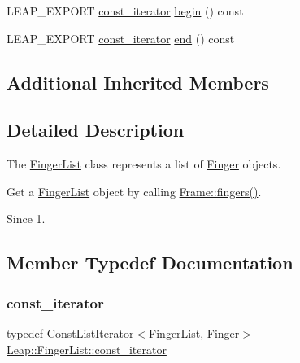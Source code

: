 \begin{DoxyCompactItemize}
\item 
L\+E\+A\+P\+\_\+\+E\+X\+P\+O\+RT \hyperlink{class_leap_1_1_finger_list_a9ecff6e555096064a09bb66a8cb5e567}{const\+\_\+iterator} \hyperlink{class_leap_1_1_finger_list_aaa68dfcacf93dd09271a746fb90c7523}{begin} () const
\item 
L\+E\+A\+P\+\_\+\+E\+X\+P\+O\+RT \hyperlink{class_leap_1_1_finger_list_a9ecff6e555096064a09bb66a8cb5e567}{const\+\_\+iterator} \hyperlink{class_leap_1_1_finger_list_a75479dbb992e84540e66179c90bd67bd}{end} () const
\end{DoxyCompactItemize}
\subsection*{Additional Inherited Members}


\subsection{Detailed Description}
The \hyperlink{class_leap_1_1_finger_list}{Finger\+List} class represents a list of \hyperlink{class_leap_1_1_finger}{Finger} objects.

Get a \hyperlink{class_leap_1_1_finger_list}{Finger\+List} object by calling \hyperlink{class_leap_1_1_frame_ad26c14d07eae913a7ff17e0ce1f2be12}{Frame\+::fingers()}.


\begin{DoxyCodeInclude}
\end{DoxyCodeInclude}


\begin{DoxySince}{Since}
1. 
\end{DoxySince}


\subsection{Member Typedef Documentation}
\mbox{\label{class_leap_1_1_finger_list_a9ecff6e555096064a09bb66a8cb5e567}} 
\subsubsection{\texorpdfstring{const\+\_\+iterator}{const\_iterator}}
{\footnotesize\ttfamily typedef \hyperlink{class_leap_1_1_const_list_iterator}{Const\+List\+Iterator}$<$\hyperlink{class_leap_1_1_finger_list}{Finger\+List}, \hyperlink{class_leap_1_1_finger}{Finger}$>$ \hyperlink{class_leap_1_1_finger_list_a9ecff6e555096064a09bb66a8cb5e567}{Leap\+::\+Finger\+List\+::const\+\_\+iterator}}

